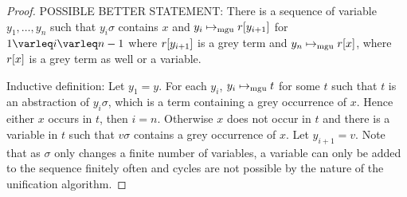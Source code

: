 \documentclass[,%
	draft=false,%
	numbers=noendperiod
	11pt,
	a4paper,
	oneside,%
	openany,
]{memoir}
\begin{document}
\begin{proof}
	
	POSSIBLE BETTER STATEMENT:
	There is a sequence of variable $y_1, \dots, y_n$ such that $y_i\sigma$ contains $x$ and $y_i \mapsto_{\operatorname{mgu}} r[y_{i+1}]$ for $1\varleq i \varleq n-1$ where $r[y_{i+1}]$ is a grey term and $y_n \mapsto_{\operatorname{mgu}} r[x]$, where $r[x]$ is a grey term as well or a variable.

	Inductive definition:
	Let $y_1 = y$. For each $y_i$, $y_i \mapsto_{\operatorname{mgu}} t$ for some $t$ such that $t$ is an abstraction of $y_i\sigma$, which is a term containing a grey occurrence of $x$.
	Hence either $x$ occurs in $t$, then $i=n$.
	Otherwise $x$ does not occur in $t$ and there is a variable in $t$ such that $v\sigma$ contains a grey occurrence of $x$.
	Let $y_{i+1} = v$.
	Note that as $\sigma$ only changes a finite number of variables, a variable can only be added to the sequence finitely often and cycles are not possible by the nature of the unification algorithm.


\end{proof}


\end{document}
